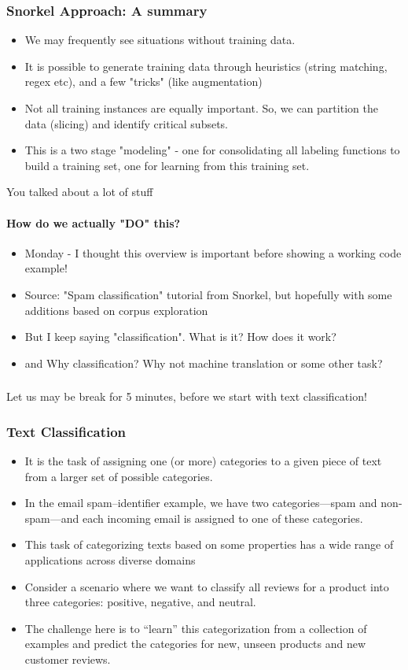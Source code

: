 \documentclass{beamer}
\begin{document}
\begin{frame}
\frametitle{Snorkel Approach: A summary}
\begin{itemize}
    \item We may frequently see situations without training data.
    \item It is possible to generate training data through heuristics (string matching, regex etc), and a few "tricks" (like augmentation)
    \item Not all training instances are equally important. So, we can partition the data (slicing) and identify critical subsets.
    \item This is a two stage "modeling" - one for consolidating all labeling functions to build a training set, one for learning from this training set. 
\end{itemize}
\end{frame}
    
\begin{frame}{You talked about a lot of stuff}
    \framesubtitle{How do we actually "DO" this?}
    \begin{itemize}
        \item Monday - I thought this overview is important before showing a working code example!
        \item Source: "Spam classification" tutorial from Snorkel, but hopefully with some additions based on corpus exploration \pause
        \item But I keep saying "classification". What is it? How does it work?
        \item and Why classification? Why not machine translation or some other task? 
    \end{itemize}
\end{frame}

\begin{frame}
\frametitle{}
Let us may be break for 5 minutes, before we start with text classification!
\end{frame}


\begin{frame}
\frametitle{Text Classification}
\begin{itemize}
    \item It is the task of assigning one (or more) categories to a given piece of text from a larger set of possible categories. \pause
    \item  In the email spam–identifier example, we have two categories—spam and non-spam—and each incoming email is assigned to one of these categories. \pause
    \item This task of categorizing texts based on some properties has a wide range of applications across diverse domains \pause
    \item Consider a scenario where we want to classify all reviews for a product into three categories: positive, negative, and neutral. 
    \item The challenge here is to “learn” this categorization from a collection of examples and predict the categories for new, unseen products and new customer reviews.
\end{itemize}
\end{frame}
\end{document}
